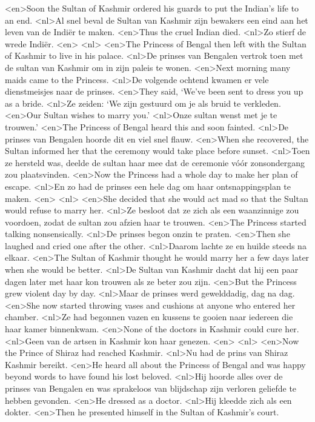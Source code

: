 <en>Soon the Sultan of Kashmir ordered his guards to put the Indian's life to an end.
<nl>Al snel beval de Sultan van Kashmir zijn bewakers een eind aan het leven van de Indi\"er te maken.
<en>Thus the cruel Indian died.
<nl>Zo stierf de wrede Indi\"er.
<en>
<nl>
<en>The Princess of Bengal then left with the Sultan of Kashmir to live in his palace.
<nl>De prinses van Bengalen vertrok toen met de sultan van Kashmir om in zijn paleis te wonen.
<en>Next morning many maids came to the Princess.
<nl>De volgende ochtend kwamen er vele dienstmeisjes naar de prinses.
<en>They said, `We've been sent to dress you up as a bride.
<nl>Ze zeiden: `We zijn gestuurd om je als bruid te verkleden.
<en>Our Sultan wishes to marry you.'
<nl>Onze sultan wenst met je te trouwen.'
<en>The Princess of Bengal heard this and soon fainted.
<nl>De prinses van Bengalen hoorde dit en viel snel flauw.
<en>When she recovered, the Sultan informed her that the ceremony would take place before sunset.
<nl>Toen ze hersteld was, deelde de sultan haar mee dat de ceremonie vóór zonsondergang zou plaatsvinden.
<en>Now the Princess had a whole day to make her plan of escape.
<nl>En zo had de prinses een hele dag om haar ontsnappingsplan te maken.
<en>
<nl>
<en>She decided that she would act mad so that the Sultan would refuse to marry her.
<nl>Ze besloot dat ze zich als een waanzinnige zou voordoen, zodat de sultan zou afzien haar te trouwen.
<en>The Princess started talking nonsensically.
<nl>De prinses begon onzin te praten.
<en>Then she laughed and cried one after the other.
<nl>Daarom lachte ze en huilde steeds na elkaar.
<en>The Sultan of Kashmir thought he would marry her a few days later when she would be better.
<nl>De Sultan van Kashmir dacht dat hij een paar dagen later met haar kon trouwen als ze beter zou zijn.
<en>But the Princess grew violent day by day.
<nl>Maar de prinses werd gewelddadig,  dag na dag.
<en>She now started throwing vases and cushions at anyone who entered her chamber.
<nl>Ze had begonnen vazen en kussens te gooien naar iedereen die haar kamer binnenkwam.
<en>None of the doctors in Kashmir could cure her.
<nl>Geen van de artsen in Kashmir kon haar genezen.
<en>
<nl>
<en>Now the Prince of Shiraz had reached Kashmir.
<nl>Nu had de prins van Shiraz Kashmir bereikt.
<en>He heard all about the Princess of Bengal and was happy beyond words to have found his lost beloved.
<nl>Hij hoorde alles over de prinses van Bengalen en was sprakeloos van blijdschap zijn verloren geliefde te hebben gevonden.
<en>He dressed as a doctor.
<nl>Hij kleedde zich als een dokter.
<en>Then he presented himself in the Sultan of Kashmir's court.
